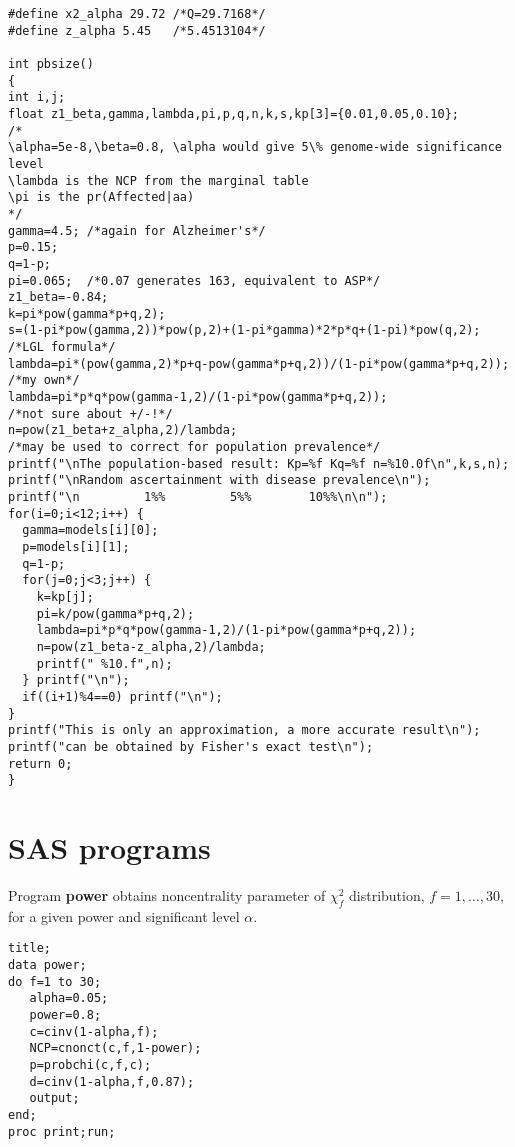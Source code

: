 \begin{verbatim}
#define x2_alpha 29.72 /*Q=29.7168*/
#define z_alpha 5.45   /*5.4513104*/

int pbsize()
{
int i,j;
float z1_beta,gamma,lambda,pi,p,q,n,k,s,kp[3]={0.01,0.05,0.10};
/*
\alpha=5e-8,\beta=0.8, \alpha would give 5\% genome-wide significance level
\lambda is the NCP from the marginal table
\pi is the pr(Affected|aa)
*/
gamma=4.5; /*again for Alzheimer's*/
p=0.15;
q=1-p;
pi=0.065;  /*0.07 generates 163, equivalent to ASP*/
z1_beta=-0.84;
k=pi*pow(gamma*p+q,2);
s=(1-pi*pow(gamma,2))*pow(p,2)+(1-pi*gamma)*2*p*q+(1-pi)*pow(q,2);
/*LGL formula*/
lambda=pi*(pow(gamma,2)*p+q-pow(gamma*p+q,2))/(1-pi*pow(gamma*p+q,2));
/*my own*/
lambda=pi*p*q*pow(gamma-1,2)/(1-pi*pow(gamma*p+q,2));
/*not sure about +/-!*/
n=pow(z1_beta+z_alpha,2)/lambda;
/*may be used to correct for population prevalence*/
printf("\nThe population-based result: Kp=%f Kq=%f n=%10.0f\n",k,s,n);
printf("\nRandom ascertainment with disease prevalence\n");
printf("\n         1%%         5%%        10%%\n\n");
for(i=0;i<12;i++) {
  gamma=models[i][0];
  p=models[i][1];
  q=1-p;
  for(j=0;j<3;j++) {
    k=kp[j];
    pi=k/pow(gamma*p+q,2);
    lambda=pi*p*q*pow(gamma-1,2)/(1-pi*pow(gamma*p+q,2));
    n=pow(z1_beta-z_alpha,2)/lambda;
    printf(" %10.f",n);
  } printf("\n");
  if((i+1)%4==0) printf("\n");
}
printf("This is only an approximation, a more accurate result\n");
printf("can be obtained by Fisher's exact test\n");
return 0;
}
\end{verbatim}

\section{SAS programs}

\noindent Program {\bf power} obtains noncentrality parameter of $\chi_f^2$
distribution, $f=1, \ldots, 30$, for a given power and significant level
$\alpha$.
\begin{verbatim}
title;
data power;
do f=1 to 30;
   alpha=0.05;
   power=0.8;
   c=cinv(1-alpha,f);
   NCP=cnonct(c,f,1-power);
   p=probchi(c,f,c);
   d=cinv(1-alpha,f,0.87);
   output;
end;
proc print;run;
\end{verbatim}

